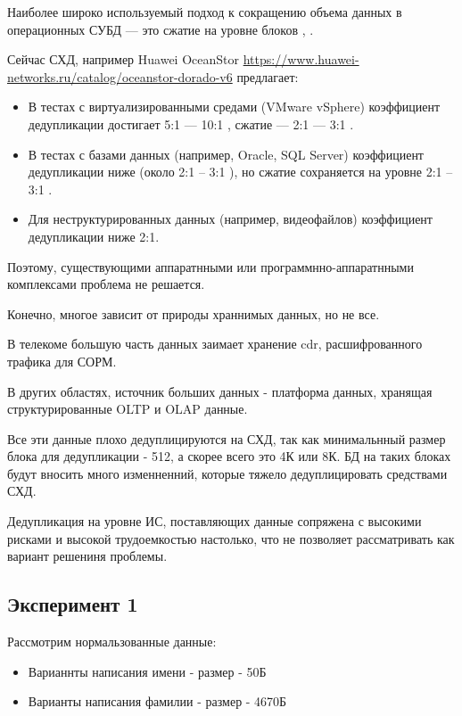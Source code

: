 \documentclass[12pt,a4paper]{article}
\begin{document}
Наиболее широко используемый подход к сокращению объема данных в операционных СУБД — это сжатие на уровне блоков \cite{Cormack85}, \cite{Iyer94} .

Сейчас СХД, например Huawei OceanStor \url{https://www.huawei-networks.ru/catalog/oceanstor-dorado-v6} предлагает:

\begin{itemize}
    \item В тестах с виртуализированными средами (VMware vSphere) коэффициент дедупликации достигает 5:1 — 10:1 , сжатие — 2:1 — 3:1 .

    \item В тестах с базами данных (например, Oracle, SQL Server) коэффициент дедупликации ниже (около 2:1 – 3:1 ), но сжатие сохраняется на уровне 2:1 – 3:1 .

    \item Для неструктурированных данных (например, видеофайлов) коэффициент дедупликации ниже 2:1.
\end{itemize}

Поэтому, существующими аппаратнными или программнно-аппаратнными комплексами проблема не решается.

Конечно, многое зависит от природы храннимых данных, но не все.

В телекоме большую часть данных заимает хранение cdr, расшифрованного трафика для СОРМ.

В других областях, источник больших данных - платформа данных, хранящая структурированные OLTP и OLAP данные.

Все эти данные плохо дедуплицируются на СХД, так как минимальнный размер блока для дедупликации - 512, а скорее всего это 4К или 8К. БД на таких блоках будут вносить много изменненний, которые тяжело дедуплицировать средствами СХД.

Дедупликация на уровне ИС, поставляющих данные сопряжена с высокими рисками и высокой трудоемкостью настолько, что не позволяет рассматривать как вариант решениня проблемы.

\subsection{Эксперимент 1}
Рассмотрим нормальзованные данные: 
\begin{itemize}
    \item Варианнты написания имени -  размер - 50Б
    \item Варианты написания фамилии -  размер - 4670Б 
\end{itemize}
\end{document}
